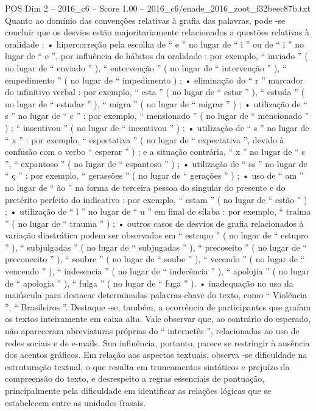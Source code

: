 \begin{textsample}{POS Dim 2 – 2016\_c6 – Score 1.00 – 2016\_c6/enade\_2016\_zoot\_f32beec87b.txt}
Quanto ao domínio das convenções relativas à grafia das palavras, pode -se concluir que os desvios estão majoritariamente relacionados a questões relativas à oralidade : • hipercorreção pela escolha de “ e ” no lugar de “ i ” ou de “ i ” no lugar de “ e ”, por influência de hábitos da oralidade : por exemplo, “ inviado ” ( no lugar de “ enviado ” ), “ entervenção ” ( no lugar de “ intervenção ” ), “ empedimento ” ( no lugar de “ impedimento ) ; • eliminação do “ r ” marcador do infinitivo verbal : por exemplo, “ esta ” ( no lugar de “ estar ” ), “ estuda ” ( no lugar de “ estudar ” ), “ migra ” ( no lugar de “ migrar ” ) ; • utilização de “ s ” no lugar de “ c ” : por exemplo, “ mensionado ” ( no lugar de “ mencionado ” ) ; “ insentivou ” ( no lugar de “ incentivou ” ) ; • utilização de “ s ” no lugar de “ x ” : por exemplo, “ espectativa ” ( no lugar de “ expectativa ”, devido à confusão com o verbo “ esperar ” ) ; e a situação contrária, “ x ” no lugar de “ s ”, “ expantoso ” ( no lugar de “ espantoso ” ) ; • utilização de “ ss ” no lugar de “ ç ” : por exemplo, “ gerassões ” ( no lugar de “ gerações ” ) ; • uso de “ am ” no lugar de “ ão ” na forma de terceira pessoa do singular do presente e do pretérito perfeito do indicativo : por exemplo, “ estam ” ( no lugar de “ estão ” ) ; • utilização de “ l ” no lugar de “ u ” em final de sílaba : por exemplo, “ tralma ” ( no lugar de “ trauma ” ) ; • outros casos de desvios de grafia relacionados à variação diastrática podem ser observados em “ estrupo ” ( no lugar de “ estupro ” ), “ subjulgadas ” ( no lugar de “ subjugadas ” ), “ precoseito ” ( no lugar de “ preconceito ” ), “ soubre ” ( no lugar de “ soube ” ), “ vecendo ” ( no lugar de “ vencendo ” ), “ indesencia ” ( no lugar de “ indecência ” ), “ apolojia ” ( no lugar de “ apologia ” ), “ fulga ” ( no lugar de “ fuga ” ). • inadequação no uso da maiúscula para destacar determinadas palavras-chave do texto, como “ Violência ”, “ Brasileiros ”.
Destaque -se, também, a ocorrência de participantes que grafam os textos inteiramente em caixa alta.
Vale observar que, ao contrário do esperado, não apareceram abreviaturas próprias do “ internetês ”, relacionadas ao uso de redes sociais e de e-mails.
Sua influência, portanto, parece se restringir à ausência dos acentos gráficos.
Em relação aos aspectos textuais, observa -se dificuldade na estruturação textual, o que resulta em truncamentos sintáticos e prejuízo da compreensão do texto, e desrespeito a regras essenciais de pontuação, principalmente pela dificuldade em identificar as relações lógicas que se estabelecem entre as unidades frasais.

\end{textsample}
